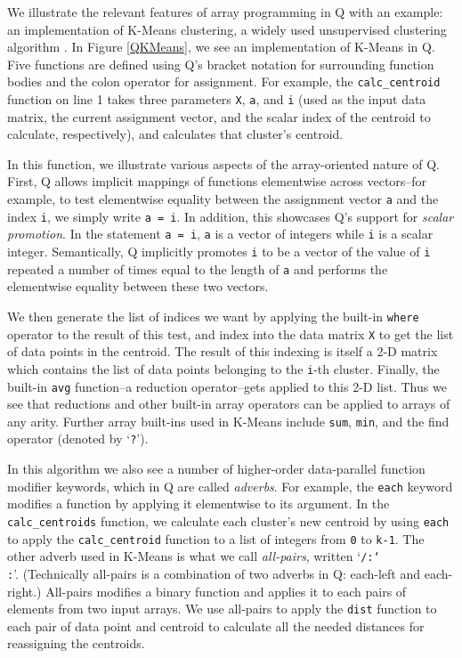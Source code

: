 \documentclass[preprint]{sigplanconf}
\begin{document}
We illustrate the relevant features of array programming in Q with an example:
an implementation of K-Means clustering, a widely used unsupervised
clustering algorithm \cite{MacQ67}.  In Figure \ref{QKMeans}, we see an
implementation of K-Means in Q.  Five functions are defined using Q's bracket
notation for surrounding function bodies and the colon operator for assignment.
For example, the
\texttt{calc\_centroid} function on line 1 takes three parameters
\texttt{X}, \texttt{a}, and \texttt{i} (used as the input data matrix, the
current assignment vector, and the scalar index of the centroid to calculate,
respectively), and calculates that cluster's centroid.

In this function, we illustrate various aspects of the array-oriented nature of
Q. First, Q allows implicit mappings of functions elementwise across
vectors--for example, to test elementwise equality between the assignment
vector \texttt{a} and the index \texttt{i}, we simply write \texttt{a = i}.  In
addition, this showcases Q's support for \emph{scalar promotion}.  In the
statement \texttt{a = i}, \texttt{a} is a vector of integers while \texttt{i} is
a scalar integer.  Semantically, Q implicitly promotes \texttt{i} to be a vector
of the value of \texttt{i} repeated a number of times equal to the length of
\texttt{a} and performs the elementwise equality between these two vectors.

We then generate the list of indices we want by applying the built-in
\texttt{where} operator to the result of this test, and index into the data
matrix \texttt{X} to get the list of data points in the centroid. The result of
this indexing is itself a 2-D matrix which contains the list of data points
belonging to the \texttt{i}-th cluster. Finally, the built-in \texttt{avg}
function--a reduction operator--gets applied to this 2-D list. Thus we see that
reductions and other built-in array operators can be applied to arrays of any
arity.  Further array built-ins used in K-Means include \texttt{sum},
\texttt{min}, and the find operator (denoted by `\texttt{?}').

In this algorithm we also see a number of higher-order data-parallel function
modifier keywords, which in Q are called \emph{adverbs}.  For example, the
\texttt{each} keyword modifies a function by applying it elementwise to its
argument.  In the \texttt{calc\_centroids} function, we calculate each cluster's
new centroid
by using \texttt{each} to apply the \texttt{calc\_centroid} function to a
list of integers from \texttt{0} to \texttt{k-1}.  The other adverb used in
K-Means is what we call \emph{all-pairs}, written `\texttt{/:\char`\\:}'.
(Technically all-pairs is a combination of two adverbs in Q: each-left and
each-right.) All-pairs modifies a binary function and applies it to each
pairs of elements from two input arrays.  We use all-pairs to apply the
\texttt{dist} function to each pair of data point and centroid to calculate all
the needed distances for reassigning the centroids.
\end{document}
